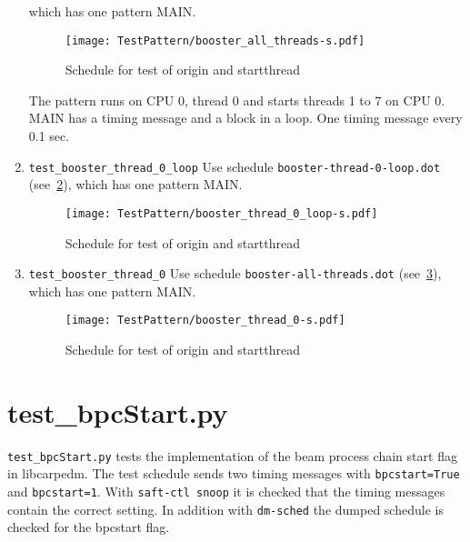 \documentclass[12pt,a4paper]{report}
\begin{document}
\begin{enumerate}
which has one pattern MAIN.
    \begin{figure}
        \centering
        \texttt{[image: TestPattern/booster\_all\_threads-s.pdf]}
        \caption{Schedule for test of origin and startthread}
        \label{fig:Schedule_booster_all_threads}
    \end{figure}
The pattern runs on CPU 0, thread 0 and starts threads 1 to 7 on CPU 0.
MAIN has a timing message and a block in a loop. One timing message every 0.1 sec.
\item \texttt{test\_booster\_thread\_0\_loop}
Use schedule \texttt{booster-thread-0-loop.dot} (see~\ref{fig:Schedule_booster_thread_0_loop}),
which has one pattern MAIN.
    \begin{figure}
        \centering
        \texttt{[image: TestPattern/booster\_thread\_0\_loop-s.pdf]}
        \caption{Schedule for test of origin and startthread}
        \label{fig:Schedule_booster_thread_0_loop}
    \end{figure}
\item \texttt{test\_booster\_thread\_0}
Use schedule \texttt{booster-all-threads.dot} (see~\ref{fig:Schedule_booster_thread_0}),
which has one pattern MAIN.
    \begin{figure}
        \centering
        \texttt{[image: TestPattern/booster\_thread\_0-s.pdf]}
        \caption{Schedule for test of origin and startthread}
        \label{fig:Schedule_booster_thread_0}
    \end{figure}
\end{enumerate}

\section{test\_bpcStart.py}
\texttt{test\_bpcStart.py} tests the implementation of the beam process chain start flag in libcarpedm.
The test schedule sends two timing messages with \texttt{bpcstart=True} and \texttt{bpcstart=1}.
With \texttt{saft-ctl snoop} it is checked that the timing messages contain the correct setting.
In addition with \texttt{dm-sched} the dumped schedule is checked for the bpcstart flag.
\end{document}
